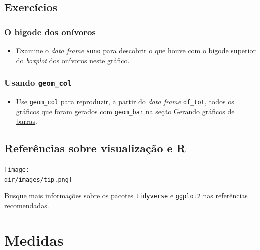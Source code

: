 \documentclass[
  11pt]{report}
\providecommand{\tightlist}{%
  \setlength{\itemsep}{0pt}\setlength{\parskip}{0pt}}
\newcommand{\dir}{/ssd/R/x86_64-pc-linux-gnu-library/4.2/fnaufelRmd/rmarkdown/resources}
\newenvironment{rmdtip}
{
  \begin{mytip}
    \texttt{[image: \\dir/images/tip.png]}
    \tcblower
  }
  {
  \end{mytip}
}
\begin{document}
\hypertarget{exercuxedcios-6}{%
\section{Exercícios}\label{exercuxedcios-6}}

\hypertarget{o-bigode-dos-onuxedvoros}{%
\subsection{O bigode dos onívoros}\label{o-bigode-dos-onuxedvoros}}

\begin{itemize}
\tightlist
\item
  Examine o \emph{data frame} \texttt{sono} para descobrir o que houve com o bigode superior do \emph{boxplot} dos onívoros \protect\hyperlink{onivoros}{neste gráfico}.
\end{itemize}

\hypertarget{usando-geom_col}{%
\subsection{\texorpdfstring{Usando \texttt{geom\_col}}{Usando geom\_col}}\label{usando-geom_col}}

\begin{itemize}
\tightlist
\item
  Use \texttt{geom\_col} para reproduzir, a partir do \emph{data frame} \texttt{df\_tot}, todos os gráficos que foram gerados com \texttt{geom\_bar} na seção \protect\hyperlink{gerando-grux5cux25C3ux5cux25A1ficos-de-barras}{Gerando gráficos de barras}.
\end{itemize}

\hypertarget{referuxeancias-sobre-visualizauxe7uxe3o-e-r}{%
\section{Referências sobre visualização e R}\label{referuxeancias-sobre-visualizauxe7uxe3o-e-r}}

\begin{rmdtip}
Busque mais informações sobre os pacotes \texttt{tidyverse} e \texttt{ggplot2} \protect\hyperlink{refrec}{nas referências recomendadas}.

\end{rmdtip}

\hypertarget{medidas}{%
\chapter{Medidas}\label{medidas}}
\end{document}
